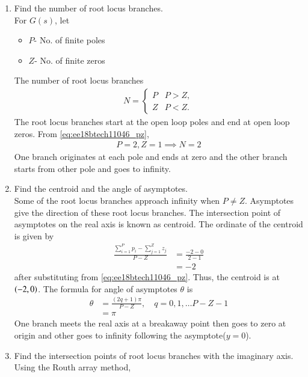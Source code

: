 \begin{enumerate}[label=\thesubsection.\arabic*.,ref=\thesubsection.\theenumi]
\item Find the number of root locus branches.
\\
\solution  For $G(s)$, let 
\begin{itemize}
\item $P$- No. of finite poles
\item $Z$- No. of finite zeros
\end{itemize}
%
The number of root locus branches
\begin{align}
N = 
\begin{cases}
P & P > Z,
\\
Z & P < Z.
\end{cases}
\end{align}
The root locus branches start at the open loop poles and end at open loop zeros. 
From \eqref{eq:ee18btech11046_pz}, 
\begin{align}
P=2, Z = 1 \implies N = 2
\end{align}
%
One branch originates at each pole and ends at zero and the other branch starts from other pole and goes to infinity.
\item Find the centroid and the angle of asymptotes.
\\
\solution 
Some of the root locus branches approach infinity when $P \ne Z$. Asymptotes give the direction of these root locus branches. The intersection point of asymptotes on the real axis is known as centroid.  The ordinate of the centroid is given by 
\begin{align}
\frac{\sum_{i=1}^{P} p_{i}-\sum_{j=1}^{Z} z_{j}}{P-Z} 
&= \frac{-2-0}{2-1}
\\
&= -2
\end{align}
%
after substituting from \eqref{eq:ee18btech11046_pz}.  Thus, the centroid is at $\left(-2,0\right)$.
The formula for angle of asymptotes $\theta$ is
\begin{align}
\theta&=\frac{(2 q+1) \pi}{P-Z}, \quad q =0, 1, \dots P-Z-1
\\
&=\pi
\end{align}
%
One branch meets the real axis at a breakaway point then goes to zero at origin and other goes to infinity following the asymptote($y=0$).
	\item Find the intersection points of root locus branches with the imaginary axis. 
\\
\solution Using the Routh array method, 


\end{enumerate}
